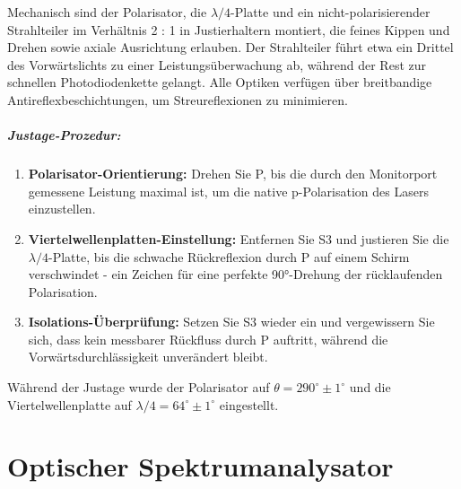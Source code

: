 Mechanisch sind der Polarisator, die $\lambda/4$-Platte und ein nicht-polarisierender Strahlteiler im Verhältnis 2 : 1 in Justierhaltern montiert, die feines Kippen und Drehen sowie axiale Ausrichtung erlauben. 
Der Strahlteiler führt etwa ein Drittel des Vorwärtslichts zu einer Leistungsüberwachung ab, während der Rest zur schnellen Photodiodenkette gelangt. Alle Optiken verfügen über breitbandige Antireflexbeschichtungen, um Streureflexionen zu minimieren.

\paragraph{Justage-Prozedur:}
\begin{enumerate}
  \item \textbf{Polarisator-Orientierung:} Drehen Sie P, bis die durch den Monitorport gemessene Leistung maximal ist, um die native p-Polarisation des Lasers einzustellen.
  \item \textbf{Viertelwellenplatten-Einstellung:} Entfernen Sie S3 und justieren Sie die $\lambda/4$-Platte, bis die schwache Rückreflexion durch P auf einem Schirm verschwindet - ein Zeichen für eine perfekte 90°-Drehung der rücklaufenden Polarisation.
  \item \textbf{Isolations-Überprüfung:} Setzen Sie S3 wieder ein und vergewissern Sie sich, dass kein messbarer Rückfluss durch P auftritt, während die Vorwärtsdurchlässigkeit unverändert bleibt.  
\end{enumerate}
Während der Justage wurde der Polarisator auf $\theta = 290^\circ \pm 1^\circ$ und die Viertelwellenplatte auf $\lambda/4 = 64^\circ \pm 1^\circ$ eingestellt.


\chapter{Optischer Spektrumanalysator}

